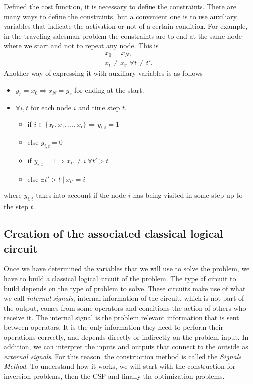 Defined the cost function, it is necessary to define the constraints. There are many ways to define the constraints, but a convenient one is to use auxiliary variables that indicate the activation or not of a certain condition. For example, in the traveling salesman problem the constraints are to end at the same node where we start and not to repeat any node. This is
\begin{equation}
\begin{gathered}
    x_0=x_{N},\\
    x_t \neq x_{t'}\ \forall t\neq t'.
\end{gathered}
\end{equation}
Another way of expressing it with auxiliary variables is as follows
\begin{itemize}
    \item $y_r = x_0 \Rightarrow x_N=y_r$ for ending at the start.
    \item $\forall i,t$ for each node $i$ and time step $t$.
    \begin{itemize}
        \item if $i\in \{x_0, x_1, \dots, x_t\} \Rightarrow y_{i,t} = 1$
        \item else $y_{i,t} = 0$
        \item if $y_{i,t} =1 \Rightarrow x_{t'} \neq i\ \forall t'>t$
        \item else $\exists t'>t\ |\ x_{t'}=i$
    \end{itemize}
\end{itemize}
where $y_{i,t}$ takes into account if the node $i$ has being visited in some step up to the step $t$.




\subsection{Creation of the associated classical logical circuit}
Once we have determined the variables that we will use to solve the problem, we have to build a classical 
logical circuit of the problem. The type of circuit to build depends on the type of problem to solve. These circuits make use of what we call \textit{internal signals}, internal information of the circuit, which is not part of the output, comes from some operators and conditions the action of others who receive it. The internal signal is the problem relevant information that is sent between operators. It is the only information they need to perform their operations correctly, and depends directly or indirectly on the problem input. In addition, we can interpret the inputs and outputs that connect to the outside as \textit{external signals}. For this reason, the construction method is called the \textit{Signals Method}. To understand how it works, we will start with the construction for inversion problems, then the CSP and finally the optimization problems.

